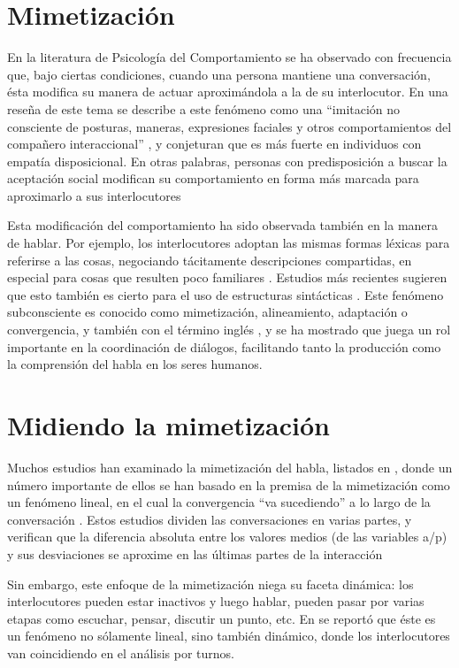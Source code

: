 \section{Mimetización}

En la literatura de Psicología del Comportamiento se ha observado con frecuencia que, bajo ciertas condiciones, cuando una persona mantiene una conversación, ésta modifica su manera de actuar aproximándola a la de su interlocutor. En una reseña de este tema se describe a este fenómeno como una ``imitación no consciente de posturas, maneras, expresiones faciales y otros comportamientos del compañero interaccional'' \cite[p. 893]{CHAR1999} , y conjeturan que es más fuerte en individuos con empatía disposicional. En otras palabras, personas con predisposición a buscar la aceptación social modifican su comportamiento en forma más marcada para aproximarlo a sus interlocutores


Esta modificación del comportamiento ha sido observada también en la manera de hablar. Por ejemplo, los interlocutores adoptan las mismas formas léxicas para referirse a las cosas, negociando tácitamente descripciones compartidas, en especial para cosas que resulten poco familiares \cite{BRE1996}. Estudios más recientes sugieren que esto también es cierto para el uso de estructuras sintácticas \cite{REI2006}. Este fenómeno subconsciente es conocido como mimetización, alineamiento, adaptación o convergencia, y también con el término inglés \entrainment, y se ha mostrado que juega un rol importante en la coordinación de diálogos, facilitando tanto la producción como la comprensión del habla en los seres humanos.

\section{Midiendo la mimetización}

Muchos estudios han examinado la mimetización del habla, listados en \cite{DEL2013}, donde un número importante de ellos se han basado en la premisa de la mimetización como un fenómeno lineal, en el cual la convergencia ``va sucediendo'' a lo largo de la conversación \cite{burgoon1995interpersonal}. Estos estudios dividen las conversaciones en varias partes, y verifican que la diferencia absoluta entre los valores medios (de las variables a/p) y sus desviaciones se aproxime en las últimas partes de la interacción

Sin embargo, este enfoque de la mimetización niega su faceta dinámica: los interlocutores pueden estar inactivos y luego hablar, pueden pasar por varias etapas como escuchar, pensar, discutir un punto, etc. En \cite{levitan2011measuring} se reportó que éste es un fenómeno no sólamente lineal, sino también dinámico, donde los interlocutores van coincidiendo en el análisis por turnos.

